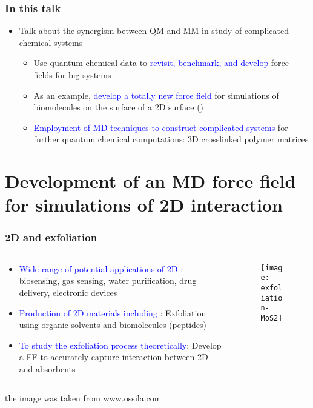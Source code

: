 \documentclass[xcolor=table,aspectratio=169]{beamer}
\begin{document}
\begin{frame}
	\frametitle{In this talk}

	\begin{itemize}
		\item Talk about the synergism between QM and MM in study of complicated chemical systems
		      \begin{itemize}
			      \item Use quantum chemical data to \textcolor{blue}{revisit, benchmark, and develop} force fields for big systems
			      \item As an example, \textcolor{blue}{develop a totally new force field} for simulations of biomolecules on the surface of a 2D surface ()
			      \item \textcolor{blue}{Employment of MD techniques to construct complicated systems} for further quantum chemical computations: 3D crosslinked polymer matrices
		      \end{itemize}
	\end{itemize}

\end{frame}


\section[Development of an MD force field]{Development of an MD force field for simulations of 2D  interaction}


\begin{frame}
	\frametitle{2D  and exfoliation}
	\begin{columns}
		\begin{column}{0.7\textwidth}
			\begin{itemize}
				\item \textcolor{blue}{Wide range of potential applications of 2D }: biosensing, gas sensing, water purification, drug delivery, electronic devices
				\item \textcolor{blue}{Production of 2D materials including }: Exfoliation using organic solvents and biomolecules (peptides)
				\item \textcolor{blue}{To study the exfoliation process theoretically}: Develop a FF to accurately capture interaction between 2D  and absorbents
			\end{itemize}
		\end{column}
		\begin{column}{0.4\textwidth}
			\begin{figure}
				\centering
				\texttt{[image: exfoliation-MoS2]}
			\end{figure}
		\end{column}
	\end{columns}
	\hfill \tiny{the image was taken from www.ossila.com}
\end{frame}
\end{document}
